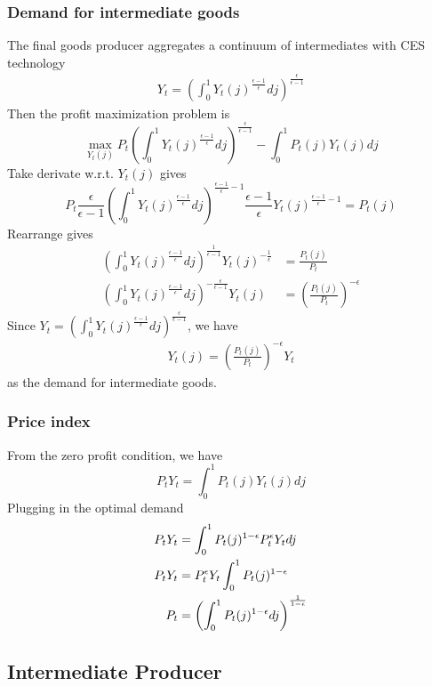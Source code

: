 \documentclass[twocolumn, fleqn]{article}
\begin{document}
	\subsubsection{Demand for intermediate goods}
	The final goods producer aggregates a continuum of intermediates with CES technology
	\begin{align}
		Y_t = \left( \int_{0}^{1} Y_t(j)^{\frac{\epsilon-1}{\epsilon}}dj\right)^{\frac{\epsilon}{\epsilon-1}}
	\end{align}
	Then the profit maximization problem is 
	\[\max_{Y_t(j)} P_t \left( \int_0^1 Y_t(j)^{\frac{\epsilon-1}{\epsilon}} dj \right)^{\frac{\epsilon}{\epsilon-1}} - \int_0^1 P_t(j) Y_t(j) dj\]	
	Take derivate w.r.t. $Y_t(j)$ gives
	\[P_t \frac{\epsilon}{\epsilon-1} \left( \int_0^1 Y_t(j)^{\frac{\epsilon-1}{\epsilon}} dj \right)^{\frac{\epsilon-1}{\epsilon}-1} \frac{\epsilon-1}{\epsilon} Y_t(j)^{\frac{\epsilon-1}{\epsilon}-1} = P_t(j)\]
	Rearrange gives
	\begin{align*}
		\left( \int_0^1 Y_t(j)^{\frac{\epsilon-1}{\epsilon}} dj \right)^{\frac{1}{\epsilon-1}} Y_t(j)^{- \frac{1}{\epsilon}} &= \frac{P_t(j)}{P_t} \\
	\left( \int_0^1 Y_t(j)^{\frac{\epsilon-1}{\epsilon}} dj \right)^{-\frac{\epsilon}{\epsilon-1}} Y_t(j) &= \left( \frac{P_t(j)}{P_t} \right)^{-\epsilon}
	\end{align*}
	Since $Y_t = \left( \int_{0}^{1} Y_t(j)^{\frac{\epsilon-1}{\epsilon}}dj\right)^{\frac{\epsilon}{\epsilon-1}}$, we have
	\begin{align}
		Y_t(j) = \left( \frac{P_t(j)}{P_t} \right)^{-\epsilon} Y_t
	\end{align}
	as the demand for intermediate goods. 
	
	\subsubsection{Price index}
	From the zero profit condition, we have
	\[P_t Y_t = \int_0^1 P_t(j) Y_t(j) dj\]
	Plugging in the optimal demand
	\begin{align}
		P_t Y_t &= \int_0^1 P_t(j)^{1-\epsilon} P_t^\epsilon Y_t dj \notag\\
		P_t Y_t &= P_t^\epsilon Y_t \int_0^1 P_t(j)^{1-\epsilon} \notag
		\\
		P_t &= \left( \int_0^1 P_t(j)^{1-\epsilon}  dj \right)^{\frac{1}{1-\epsilon}}
	\end{align}
	
	\subsection{Intermediate Producer}
\end{document}
